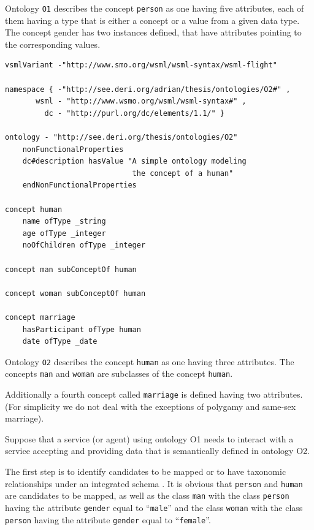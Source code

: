 \documentclass{fast_latex}
\begin{document}
Ontology \texttt{O1} describes the concept
\texttt{person} as one having five attributes, each of
them having a type that is either a concept or a value from a given
data type. The concept gender has two instances defined, that have
attributes pointing to the corresponding values. 

\begin{lstlisting}
vsmlVariant -"http://www.smo.org/wsml/wsml-syntax/wsml-flight"

namespace { -"http://see.deri.org/adrian/thesis/ontologies/O2#" ,
       wsml - "http://www.wsmo.org/wsml/wsml-syntax#" ,
         dc - "http://purl.org/dc/elements/1.1/" }

ontology - "http://see.deri.org/thesis/ontologies/O2"
    nonFunctionalProperties
    dc#description hasValue "A simple ontology modeling
                             the concept of a human"
    endNonFunctionalProperties

concept human
    name ofType _string
    age ofType _integer
    noOfChildren ofType _integer

concept man subConceptOf human

concept woman subConceptOf human

concept marriage
    hasParticipant ofType human
    date ofType _date
\end{lstlisting}

Ontology \texttt{O2} describes the concept
\texttt{human} as one having three attributes. The
concepts \texttt{man} and \texttt{woman} are
subclasses of the concept \texttt{human}. 

Additionally a fourth concept called \texttt{marriage} is
defined having two attributes. (For simplicity we do not deal with the
exceptions of polygamy and same-sex marriage). 

Suppose that a service (or agent) using ontology O1 needs to interact
with a service accepting and providing data that is semantically
defined in ontology O2. 

The first step is to identify candidates to be mapped or to have
taxonomic relationships under an integrated schema \cite{shvaiko2005schema_based}. It is obvious that \texttt{person} and
\texttt{human} are candidates to be mapped, as well as the
class \texttt{man} with the class
\texttt{person} having the attribute
\texttt{gender} equal to
{\textquotedblleft}\texttt{male}{\textquotedblright} and
the class \texttt{woman} with the class
\texttt{person} having the attribute
\texttt{gender} equal to
{\textquotedblleft}\texttt{female}{\textquotedblright}. 
\end{document}
